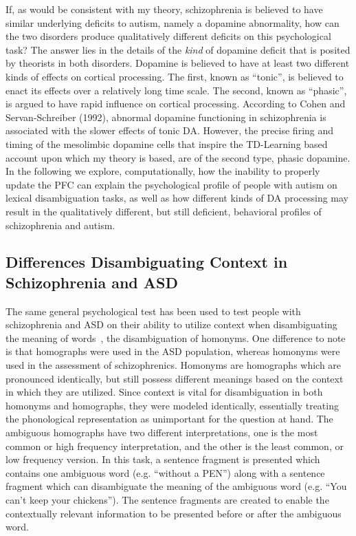 \documentclass[man]{apa}
\begin{document}
If, as would be consistent with my theory, schizophrenia is believed to have similar underlying deficits to autism, namely a dopamine abnormality, how can the two disorders produce qualitatively different deficits on this psychological task?  The answer lies in the details of the \emph{kind} of dopamine deficit that is posited by theorists in both disorders.  Dopamine is believed to have at least two different kinds of effects on cortical processing.  The first, known as ``tonic'', is believed to enact its effects over a relatively long time scale.  The second, known as ``phasic'', is argued to have rapid influence on cortical processing.  According to Cohen and Servan-Schreiber (1992), abnormal dopamine functioning in schizophrenia is associated with the slower effects of tonic DA.  However, the precise firing and timing of the mesolimbic dopamine cells that inspire the TD-Learning based account upon which my theory is based, are of the second type, phasic dopamine.  In the following we explore, computationally, how the inability to properly update the PFC can explain the psychological profile of people with autism on lexical disambiguation tasks, as well as how different kinds of DA processing may result in the qualitatively different, but still deficient, behavioral profiles of schizophrenia and autism. 

\subsection{Differences Disambiguating Context in Schizophrenia and ASD}
The same general psychological test has been used to test people with schizophrenia and ASD on their ability to utilize context when disambiguating the meaning of words~\cite{CohenJD:1992:Schizophrenia,RefWorks:103,HappeF:1997:WCC_Homographs}, the disambiguation of homonyms. One difference to note is that homographs were used in the ASD population, whereas homonyms were used in the assessment of schizophrenics.  Homonyms are homographs which are pronounced identically, but still possess different meanings based on the context in which they are utilized.  Since context is vital for disambiguation in both homonyms and homographs, they were modeled identically, essentially treating the phonological representation as unimportant for the question at hand.  The ambiguous homographs have two different interpretations, one is the most common or high frequency interpretation, and the other is the least common, or low frequency version.  In this task, a sentence fragment is presented which contains one ambiguous word (e.g. ``without a PEN'') along with a sentence fragment which can disambiguate the meaning of the ambiguous word (e.g. ``You can't keep your chickens'').  The sentence fragments are created to enable the contextually relevant information to be presented before or after the ambiguous word.
\end{document}
